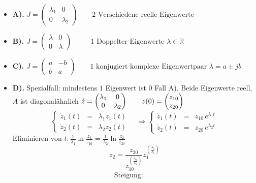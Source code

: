 \documentclass[11pt,a4paper]{article}
\begin{document}
\begin{itemize}
\item \textbf{A).} 
$J=
\begin{pmatrix}
\lambda_1 & 0\\
0 & \lambda_2
\end{pmatrix} \qquad \text{2 Verschiedene reelle Eigenwerte}
$
\item\textbf{B).} 
$J=
\begin{pmatrix}
\lambda & 0\\
0 & \lambda
\end{pmatrix} \qquad \text{~~1 Doppelter Eigenwerte } \lambda \in \mathbb{R} 
$
\item\textbf{C).} 
$J=
\begin{pmatrix}
a & -b\\
b & a
\end{pmatrix} \qquad \text{1 konjugiert komplexe Eigenwertpaar } \lambda = a \pm jb 
$
\item\textbf{D).} Spezialfall: 
mindestens $1$ Eigenwert ist $0$ Fall A). Beide Eigenwerte reell, $A$ ist diagonalähnlich 
$ 
\dot z=
\begin{pmatrix}
\lambda_1 & 0\\
0 & \lambda_2
\end{pmatrix} \qquad 
z(0)=
\begin{pmatrix}
z_{10}\\
z_{20}
\end{pmatrix}\\
$ 
\begin{equation}
\boxed{\left\{
\begin{matrix}
\dot z_1(t) &=& \lambda_1 z_1(t)\\
\dot z_2(t) &=& \lambda_2 z_2(t)
\end{matrix}
\right. }
\quad
\Rightarrow 
\boxed{\left\{
\begin{matrix}
\dot z_1(t) &=& z_{10} \,e^{\lambda_1 t}\\
\dot z_2(t) &=& z_{20} \,e^{\lambda_2 t}
\end{matrix}
\right.
}
\tag{2.2}
\end{equation}
$ 
\text{Eliminieren von } t:
\frac{1}{\lambda_1} \ln{ \frac{z_1}{z_{10}}} = \frac{1}{\lambda_2} \ln{ \frac{z_2}{z_{20}}}\qquad
$ 
\begin{equation}
\boxed{z_2 = \frac{z_{20}}{z_{10}^{(\frac{\lambda_2}{\lambda_1} )}} z_1^{(\frac{\lambda_2}{\lambda_1})}
}
\tag{2.3}
\end{equation}
\begin{align}
\boxed{\text{ Steigung:}\qquad
}
\end{align}
\end{itemize}
\end{document}
